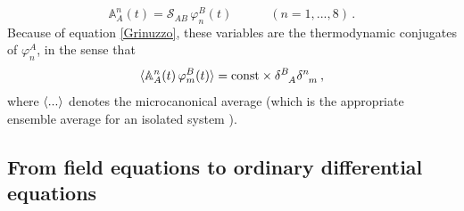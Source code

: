 \documentclass[a4paper, amsfonts, amssymb, amsmath, reprint, showkeys, nofootinbib, twoside, onecolumn,notitlepage]{revtex4-1}
\newcommand{\spc}{\quad \quad \quad}
\begin{document}
\begin{equation}
\mathbb{A}^n_A(t) = \mathcal{S}_{AB} \, \varphi^B_n(t) \spc (n=1,...,8) \, .
\end{equation} 
Because of equation \eqref{Grinuzzo}, these variables are the thermodynamic conjugates of $\varphi^A_n$, in the
sense that \cite{landau5} 
\begin{equation}\label{ConjugoA}
\braket{\mathbb{A}_A^n(t) \, \varphi^B_m(t)}= \text{const} \times\delta\indices{^B _A} \delta\indices{^n _m}  \, ,
\end{equation}
where $\braket{...}$ denotes the microcanonical average (which is the appropriate ensemble average for an isolated system \cite{huang_book}).

\subsection{From field equations to ordinary differential equations}
\end{document}
